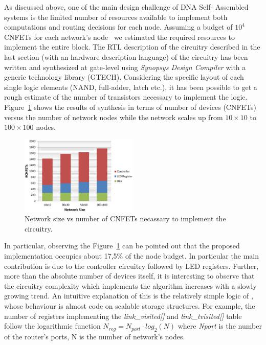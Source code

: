 As discussed above, one of the main design challenge of DNA Self-
Assembled systems is the limited number of resources available to implement both
computations and routing decisions for each node. Assuming a budget of
$10^4$ CNFETs for each network's node~\cite{liu_jetcs}  we estimated
the required resources to implement the entire \disr{} block. The RTL
description of the circuitry described in the last section (with an
hardware description language)  of the \disr{} circuitry has been written
and synthesized at gate-level using \emph{Synopsys Design Compiler} with 
a generic technology library (GTECH).
Considering the specific layout of each single logic elements  (NAND,
full-adder, latch etc.), it has been possible to get a rough estimate
of the number of transistors necessary to implement the \disr{} logic.
Figure~\ref{fig:synthesys} shows the results of synthesis in terms of
number of devices (CNFETs) versus the number of network nodes while
the network scales up from $10\times10$ to $100\times100$ nodes.

\begin{figure}
  \centering
  \includegraphics[width=0.50\textwidth]{pictures/synthesis.eps}
  \caption{Network size vs number of CNFETs necassary to implement
  the \disr{} circuitry.}
 \label{fig:synthesys}
\end{figure}

In particular, observing the Figure~\ref{fig:synthesys} can  be
pointed out that the proposed implementation occupies about 17,5\% of
the node budget. In particular the main contribution is due to the
controller circuitry followed by LED registers. Further, more than the
absolute number of devices itself, it is interesting to observe that
the circuitry complexity which implements the \disr{} algorithm increases
with a slowly growing trend.   An intuitive explanation of this is the
relatively simple logic of \disr{}, whose behaviour is almost code on
scalable storage structures. For example, the number of registers
implementing the \emph{link\_visited[]} and \emph{link\_tvisited[]}
table follow the logarithmic function $N_{reg}=N_{port} \cdot
log_2(N)$ where \emph{Nport} is the number of the router’s ports, N is
the number of network’s nodes.


